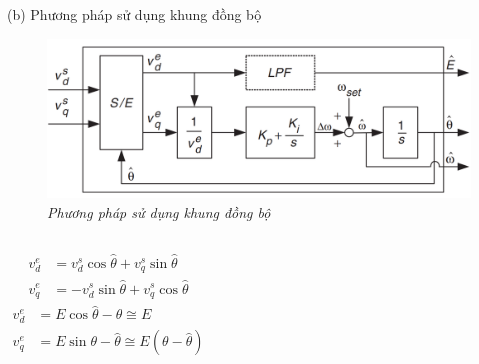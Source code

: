\documentclass[11pt]{beamer}
\renewcommand{\label}[1]{%
			\gdef\sfname{sf:##1}}%
\begin{document}
	\begin{frame}[t]{(b) Phương pháp sử dụng khung đồng bộ}
		\begin{figure}[h]
			\includegraphics[width=.9\textwidth]{Fig. 10 Method using synchronous frame.PNG}
			\caption{\centering \textit{Phương pháp sử dụng khung đồng bộ}}
			\label{fig:Phương pháp sử dụng khung đồng bộ}
		\end{figure}
	
		\begin{columns}
				\centering
				\begin{align*}
					v_d^e &= v_d^s \cos{\hat{\theta}} + v_q^s \sin{\hat{\theta}}\\
					v_q^e &= -v_d^s \sin{\hat{\theta}} + v_q^s \cos{\hat{\theta}}
				\end{align*}
				\centering
				\begin{align*}
					v_d^e &= E \cos{\hat{\theta} - \theta} \cong E \\
					v_q^e &= E \sin{\theta - \hat{\theta}} \cong E(\theta - \hat{\theta})
				\end{align*}
			
		\end{columns}
		
	\end{frame}
\end{document}
